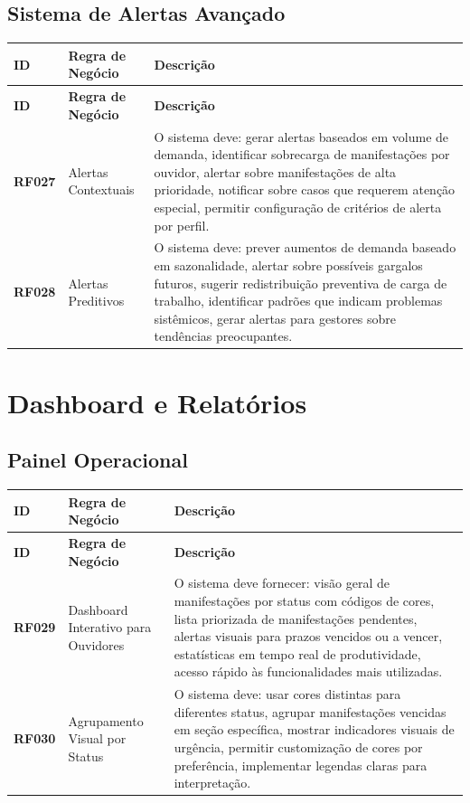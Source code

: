 \documentclass[12pt,a4paper]{article}
\newcommand{\rf}[1]{\textbf{\color{primaryblue}RF#1}}
\begin{document}
\subsection{Sistema de Alertas Avançado}

\begin{longtable}{|p{2cm}|p{5cm}|p{8cm}|}
\hline
\textbf{ID} & \textbf{Regra de Negócio} & \textbf{Descrição} \\
\hline
\endfirsthead
\hline
\textbf{ID} & \textbf{Regra de Negócio} & \textbf{Descrição} \\
\hline
\endhead

\rf{027} & Alertas Contextuais & O sistema deve: gerar alertas baseados em volume de demanda, identificar sobrecarga de manifestações por ouvidor, alertar sobre manifestações de alta prioridade, notificar sobre casos que requerem atenção especial, permitir configuração de critérios de alerta por perfil. \\
\hline

\rf{028} & Alertas Preditivos & O sistema deve: prever aumentos de demanda baseado em sazonalidade, alertar sobre possíveis gargalos futuros, sugerir redistribuição preventiva de carga de trabalho, identificar padrões que indicam problemas sistêmicos, gerar alertas para gestores sobre tendências preocupantes. \\
\hline

\end{longtable}

\section{Dashboard e Relatórios}

\subsection{Painel Operacional}

\begin{longtable}{|p{2cm}|p{5cm}|p{8cm}|}
\hline
\textbf{ID} & \textbf{Regra de Negócio} & \textbf{Descrição} \\
\hline
\endfirsthead
\hline
\textbf{ID} & \textbf{Regra de Negócio} & \textbf{Descrição} \\
\hline
\endhead

\rf{029} & Dashboard Interativo para Ouvidores & O sistema deve fornecer: visão geral de manifestações por status com códigos de cores, lista priorizada de manifestações pendentes, alertas visuais para prazos vencidos ou a vencer, estatísticas em tempo real de produtividade, acesso rápido às funcionalidades mais utilizadas. \\
\hline

\rf{030} & Agrupamento Visual por Status & O sistema deve: usar cores distintas para diferentes status, agrupar manifestações vencidas em seção específica, mostrar indicadores visuais de urgência, permitir customização de cores por preferência, implementar legendas claras para interpretação. \\
\hline

\end{longtable}
\end{document}
